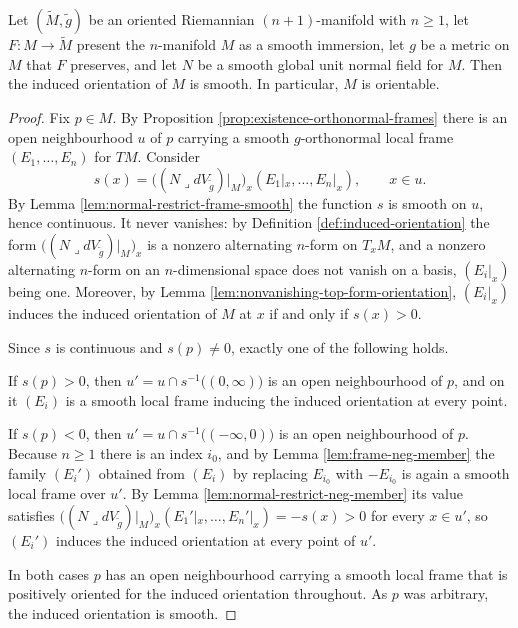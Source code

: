 \begin{proposition}
\label{prop:hypersurface-orientable-of-normal}
\leanok
{}
Let $(\tilde M, \tilde g)$ be an oriented Riemannian $(n+1)$-manifold with $n \geq 1$, let
$F : M \to \tilde M$ present the $n$-manifold $M$ as a smooth immersion, let $g$ be a metric on
$M$ that $F$ preserves, and let $N$ be a smooth global unit normal field for $M$. Then the
induced orientation of $M$ is smooth. In particular, $M$ is orientable.
\end{proposition}

\begin{proof}
\leanok
{}
Fix $p \in M$. By Proposition \ref{prop:existence-orthonormal-frames} there is an open
neighbourhood $u$ of $p$ carrying a smooth $g$-orthonormal local frame $(E_1, \ldots, E_n)$ for
$TM$. Consider
\[
  s(x) = \bigl((N \lrcorner dV_{\tilde g})|_M\bigr)_x(E_1|_x, \ldots, E_n|_x),
  \qquad x \in u .
\]
By Lemma \ref{lem:normal-restrict-frame-smooth} the function $s$ is smooth on $u$, hence
continuous. It never vanishes: by Definition \ref{def:induced-orientation} the form
$\bigl((N \lrcorner dV_{\tilde g})|_M\bigr)_x$ is a nonzero alternating $n$-form on $T_x M$, and
a nonzero alternating $n$-form on an $n$-dimensional space does not vanish on a basis, $(E_i|_x)$
being one. Moreover, by Lemma \ref{lem:nonvanishing-top-form-orientation}, $(E_i|_x)$ induces the
induced orientation of $M$ at $x$ if and only if $s(x) > 0$.

Since $s$ is continuous and $s(p) \neq 0$, exactly one of the following holds.

If $s(p) > 0$, then $u' = u \cap s^{-1}\bigl((0,\infty)\bigr)$ is an open neighbourhood of $p$, and
on it $(E_i)$ is a smooth local frame inducing the induced orientation at every point.

If $s(p) < 0$, then $u' = u \cap s^{-1}\bigl((-\infty,0)\bigr)$ is an open neighbourhood of $p$.
Because $n \geq 1$ there is an index $i_0$, and by Lemma \ref{lem:frame-neg-member} the family
$(E_i')$ obtained from $(E_i)$ by replacing $E_{i_0}$ with $-E_{i_0}$ is again a smooth local
frame over $u'$. By Lemma \ref{lem:normal-restrict-neg-member} its value satisfies
$\bigl((N \lrcorner dV_{\tilde g})|_M\bigr)_x(E_1'|_x, \ldots, E_n'|_x) = -s(x) > 0$ for every
$x \in u'$, so $(E_i')$ induces the induced orientation at every point of $u'$.

In both cases $p$ has an open neighbourhood carrying a smooth local frame that is positively
oriented for the induced orientation throughout. As $p$ was arbitrary, the induced orientation is
smooth.
\end{proof}

